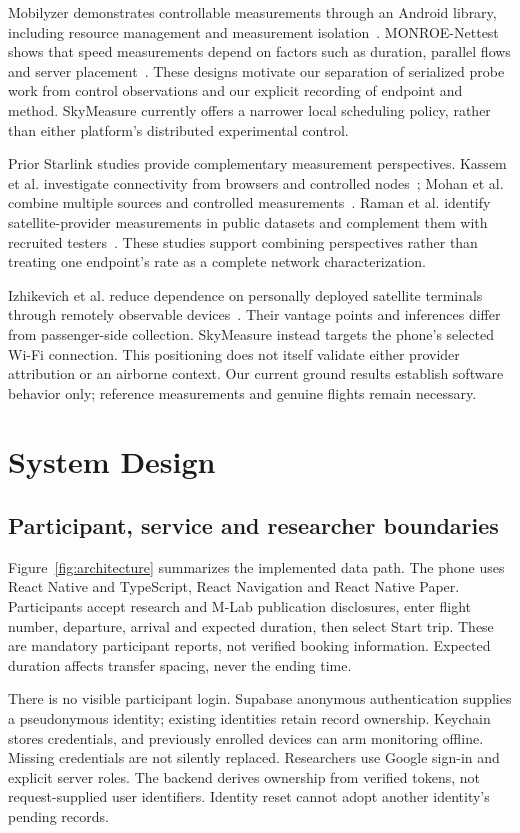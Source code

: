 Mobilyzer demonstrates controllable measurements through an Android library,
including resource management and measurement isolation~\cite{nikravesh2015}.
MONROE-Nettest shows that speed measurements depend on factors such as duration,
parallel flows and server placement~\cite{midoglu2018}. These designs motivate
our separation of serialized probe work from control observations and our
explicit recording of endpoint and method. SkyMeasure currently offers a narrower
local scheduling policy, rather than either platform's distributed experimental
control.

Prior Starlink studies provide complementary measurement perspectives.
Kassem et al. investigate connectivity from browsers and controlled
nodes~\cite{kassem2022}; Mohan et al. combine multiple sources and controlled
measurements~\cite{mohan2024}. Raman et al. identify satellite-provider
measurements in public datasets and complement them with recruited
testers~\cite{raman2023}. These studies support combining perspectives rather
than treating one endpoint's rate as a complete network characterization.

Izhikevich et al. reduce dependence on personally deployed satellite terminals
through remotely observable devices~\cite{izhikevich2024}. Their vantage points
and inferences differ from passenger-side collection. SkyMeasure instead targets
the phone's selected Wi-Fi connection. This positioning does not itself validate
either provider attribution or an airborne context. Our current ground results
establish software behavior only; reference measurements and genuine flights
remain necessary.

\section{System Design}
\subsection{Participant, service and researcher boundaries}
Figure~\ref{fig:architecture} summarizes the implemented data path. The phone
uses React Native and TypeScript, React Navigation and React Native Paper.
Participants accept research and M-Lab publication disclosures, enter flight
number, departure, arrival and expected duration, then select Start trip. These
are mandatory participant reports, not verified booking information. Expected
duration affects transfer spacing, never the ending time.

There is no visible participant login. Supabase anonymous authentication supplies
a pseudonymous identity; existing identities retain record ownership. Keychain
stores credentials, and previously enrolled devices can arm monitoring offline.
Missing credentials are not silently replaced. Researchers use Google sign-in
and explicit server roles. The backend derives ownership from verified tokens,
not request-supplied user identifiers. Identity reset cannot adopt another
identity's pending records.

